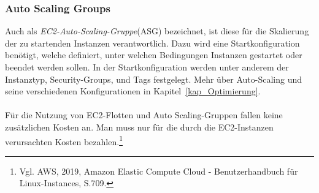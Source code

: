 \subsubsection*{Auto Scaling Groups}%
Auch als \textit{EC2-Auto-Scaling-Gruppe}(ASG) bezeichnet, ist diese für die Skalierung der zu startenden Instanzen verantwortlich. Dazu wird eine Startkonfiguration benötigt, welche definiert, unter welchen Bedingungen Instanzen gestartet oder beendet werden sollen. In der Startkonfiguration werden unter anderem der Instanztyp, Security-Groups, und Tags festgelegt. Mehr über Auto-Scaling und seine verschiedenen Konfigurationen in Kapitel~\ref{kap_Optimierung}.
\\\\
Für die Nutzung von EC2-Flotten und Auto Scaling-Gruppen fallen keine zusätzlichen Kosten an. Man muss nur für die durch die EC2-Instanzen verursachten Kosten bezahlen.\footnote{Vgl. AWS, 2019, Amazon Elastic Compute Cloud - Benutzerhandbuch für Linux-Instances, S.709\cite{AMZ26}. }

